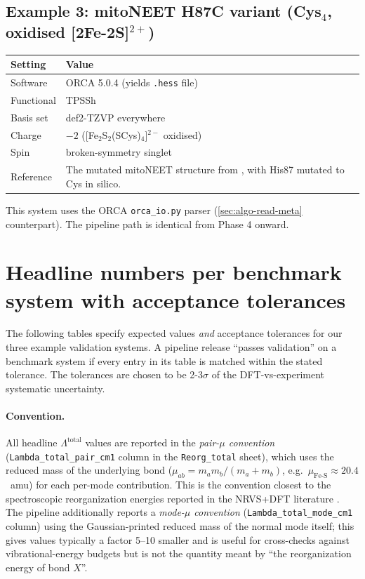 \documentclass[10pt,a4paper,twoside]{article}
\newcommand{\fn}[1]{\texttt{#1}}
\begin{document}
\subsection{Example 3: mitoNEET H87C variant (Cys$_4$, oxidised [2Fe-2S]$^{2+}$)}

\begin{longtable}{p{} p{}}
\toprule
\textbf{Setting} & \textbf{Value} \\
\midrule
Software             & ORCA 5.0.4 (yields \texttt{.hess} file) \\
Functional           & TPSSh \\
Basis set            & def2-TZVP everywhere \\
Charge               & $-2$ ([Fe$_2$S$_2$(SCys)$_4$]$^{2-}$
                       oxidised) \\
Spin                 & broken-symmetry singlet \\
Reference            & The mutated mitoNEET structure from
                       \cite{Paddock2007}, with His87 mutated to
                       Cys in silico. \\
\bottomrule
\end{longtable}

This system uses the ORCA \fn{orca\_io.py} parser (\cref{sec:algo-read-meta}
counterpart). The pipeline path is identical from
Phase 4 onward.

\section{Headline numbers per benchmark system with acceptance tolerances}
\label{sec:headline-numbers}

The following tables specify expected values \emph{and} acceptance
tolerances for our three example validation systems. A pipeline
release ``passes validation'' on a benchmark system if every entry
in its table is matched within the stated tolerance. The
tolerances are chosen to be 2-3$\sigma$ of the DFT-vs-experiment
systematic uncertainty.

\paragraph{Convention.}
All headline $\Lambda^\text{total}$ values are reported in the
\emph{pair-$\mu$ convention} (\fn{Lambda\_total\_pair\_cm1} column
in the \texttt{Reorg\_total} sheet), which uses the reduced mass of
the underlying bond ($\mu_{ab} = m_a m_b / (m_a + m_b)$, e.g.\
$\mu_\text{Fe-S} \approx 20.4$~amu) for each per-mode contribution.
This is the convention closest to the spectroscopic reorganization
energies reported in the NRVS+DFT literature
\cite{Gee2021,Mitra2017}. The pipeline additionally reports a
\emph{mode-$\mu$ convention} (\fn{Lambda\_total\_mode\_cm1} column)
using the Gaussian-printed reduced mass of the normal mode itself;
this gives values typically a factor 5--10 smaller and is useful
for cross-checks against vibrational-energy budgets but is not the
quantity meant by ``the reorganization energy of bond $X$''.
\end{document}

